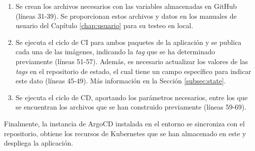\begin{enumerate}
  \item Se crean los archivos necesarios con las variables almacenadas en GitHub (líneas 31-39). Se proporcionan estos archivos y datos en los manuales de usuario del Capítulo \ref{chap:usuario} para su testeo en local.
  \item Se ejecuta el ciclo de CI para ambos paquetes de la aplicación y se publica cada una de las imágenes, indicando la \textit{tag} que se ha determinado previamente (líneas 51-57). Además, es necesario actualizar los valores de las \textit{tags} en el repositorio de estado, el cual tiene un campo específico para indicar este dato (líneas 45-49). Más información en la Sección \ref{subsec:state}.
  \item Se ejecuta el ciclo de CD, aportando los parámetros necesarios, entre los que se encuentran los archivos que se han construido previamente (líneas 59-69).
\end{enumerate}

Finalmente, la instancia de ArgoCD instalada en el entorno se sincroniza con el repositorio, obtiene los recursos de Kubernetes que se han almacenado en este y despliega la aplicación.

